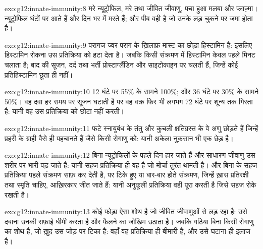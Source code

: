 \begin{solution}{exo:g12:innate-immunity:8}
मरे न्यूट्रोफिल, मरे तथा जीवित जीवाणु, पचा हुआ मलबा और प्लाज़्मा।
न्यूट्रोफिल घंटों पर आते हैं और दिन भर में मरते हैं; और पीब वही है जो उनके
लड़ चुकने पर जमा होता है।
\end{solution}

\begin{solution}{exo:g12:innate-immunity:9}
परागज ज्वर पराग के ख़िलाफ़ मास्ट  का छोड़ा हिस्टामिन है: इसलिए
हिस्टामिन रोकना उस प्रतिक्रिया को हटा देता है। जबकि किसी संक्रमण में
हिस्टामिन केवल पहले मिनट चलाता है; बाद की सूजन, दर्द तथा भर्ती
प्रोस्टाग्लैंडिन और साइटोकाइन पर चलती हैं, जिन्हें कोई प्रतिहिस्टामिन छूता
ही नहीं।
\end{solution}

\begin{solution}{exo:g12:innate-immunity:10}
12 घंटे पर 55\% के सामने 100\%; और 36 घंटे पर 30\% के सामने 50\%। वह दवा
हर समय पर सूजन घटाती है पर वह वक्र फिर भी लगभग 72 घंटे पर शून्य तक गिरता है:
यानी वह उस प्रतिक्रिया को छोटा नहीं करती।
\end{solution}

\begin{solution}{exo:g12:innate-immunity:11}
फटे स्नायुबंध के तंतु और कुचली  क्षतिग्रस्त  के वे अणु
छोड़ते हैं जिन्हें प्रहरी  के ग्राही वैसे ही पहचानते हैं जैसे किसी
रोगाणु को: यानी अकेला नुक़सान भी एक छेड़ है।
\end{solution}

\begin{solution}{exo:g12:innate-immunity:12}
बिना न्यूट्रोफिलों के पहले दिन हार जाते हैं और साधारण जीवाणु उस शरीर पर
भारी पड़ जाते हैं: यानी सहज प्रतिक्रिया ही वह है जो मोर्चा तुरंत थामती है।
और बिना  के सहज प्रतिक्रिया पहले संक्रमण साफ़ कर देती है,
पर टिके हुए या बार-बार होते संक्रमण, जिन्हें ख़ास प्रतिरक्षी तथा स्मृति
चाहिए, आख़िरकार जीत जाते हैं: यानी अनुकूली प्रतिक्रिया वही पूरा करती है
जिसे सहज रोके रखती है।
\end{solution}

\begin{solution}{exo:g12:innate-immunity:13}
कोई फोड़ा ऐसा शोथ है जो जीवित जीवाणुओं से लड़ रहा है: उसे दबाना उनकी सफ़ाई
धीमी करता है और फैलने का जोखिम उठाता है। जबकि गठिया बिना किसी रोगाणु का शोथ
है, जो ख़ुद उस जोड़ पर टिका है: वहाँ वह प्रतिक्रिया ही बीमारी है, और उसे
घटाना ही इलाज है।
\end{solution}

